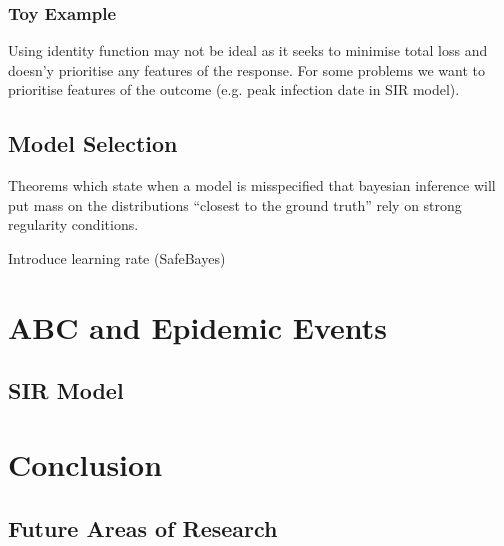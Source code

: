 \documentclass[11pt,a4paper]{article}
\theoremstyle{break}
\begin{document}
\subsubsection{Toy Example}\label{sec_summary_statistics_toy}

  Using identity function may not be ideal as it seeks to minimise total loss and doesn'y prioritise any features of the response. For some problems we want to prioritise features of the outcome (e.g. peak infection date in SIR model).

\subsection{Model Selection}

  \par Theorems which state when a model is misspecified that bayesian inference will put mass on the distributions ``closest to the ground truth'' rely on strong regularity conditions. \cite[]{inconsistency_of_bayesian_inference_for_misspecified_linear_models_and_a_proposal_for_reparing_it}
  \par Introduce learning rate (SafeBayes) \cite[]{inconsistency_of_bayesian_inference_for_misspecified_linear_models_and_a_proposal_for_reparing_it}

\newpage
\section{ABC and Epidemic Events}\label{sec_epidemic_events}

\subsection{SIR Model}\label{abc_sir_model}

\newpage
\section{Conclusion}

\subsection{Future Areas of Research}


\newpage
\setcounter{page}{1}


\end{document}
